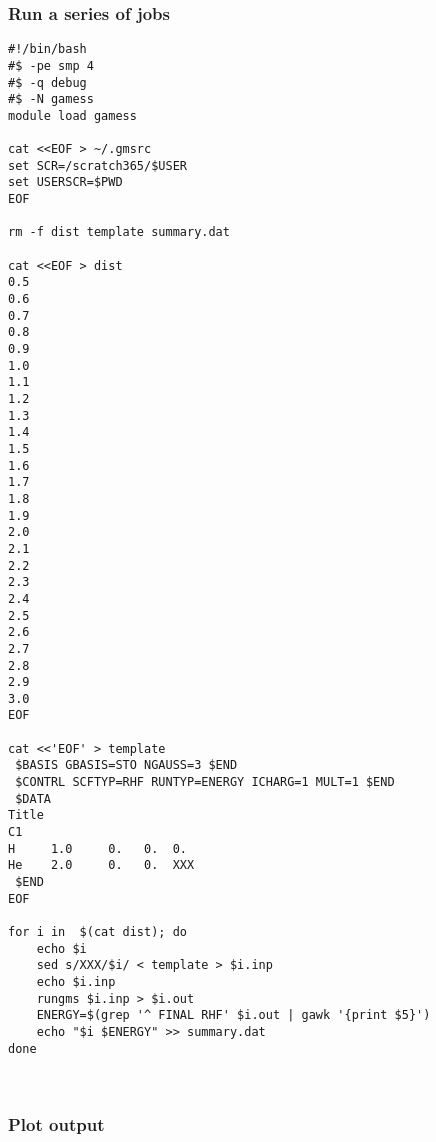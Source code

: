 \documentclass[11pt]{article}
\begin{document}
\subsubsection{Run a series of jobs}
\label{sec:orgc16d085}
\begin{verbatim}
#!/bin/bash
#$ -pe smp 4
#$ -q debug
#$ -N gamess
module load gamess

cat <<EOF > ~/.gmsrc
set SCR=/scratch365/$USER
set USERSCR=$PWD
EOF

rm -f dist template summary.dat

cat <<EOF > dist
0.5
0.6
0.7
0.8
0.9
1.0
1.1
1.2
1.3
1.4
1.5
1.6
1.7
1.8
1.9
2.0
2.1
2.2
2.3
2.4
2.5
2.6
2.7
2.8
2.9
3.0
EOF

cat <<'EOF' > template
 $BASIS GBASIS=STO NGAUSS=3 $END
 $CONTRL SCFTYP=RHF RUNTYP=ENERGY ICHARG=1 MULT=1 $END
 $DATA 
Title
C1
H     1.0     0.   0.  0.
He    2.0     0.   0.  XXX
 $END
EOF

for i in  $(cat dist); do
    echo $i
    sed s/XXX/$i/ < template > $i.inp
    echo $i.inp
    rungms $i.inp > $i.out
    ENERGY=$(grep '^ FINAL RHF' $i.out | gawk '{print $5}')
    echo "$i $ENERGY" >> summary.dat
done



\end{verbatim}
\subsubsection{Plot output}
\label{sec:org75ba150}
\end{document}
